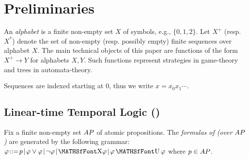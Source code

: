 
\section{Preliminaries} \label{sec:prelims}

An \emph{alphabet} is a finite non-empty set $X$ of symbols, e.g., $\{0,1,2\}$. Let $X^+$ (resp. $X^*$) denote the set of non-empty (resp. possibly empty) finite sequences over alphabet $X$. The main technical objects of this paper are functions of the form $X^+ \to Y$ for alphabets $X,Y$. Such functions represent strategies in game-theory and trees in automata-theory. 

Sequences are indexed starting at $0$, thus we write $x = x_0 x_1 \cdots$. 



\subsection{Linear-time Temporal Logic (\LTL)} \label{sec:prelims:LTL}

	Fix a finite non-empty set ${AP}$ of atomic propositions.
	The \emph{formulas of \LTL (over ${AP}$)} are generated by the following grammar:
	$\varphi \!::=\! p \!\mid\! \varphi \vee \varphi \!\mid\! \neg \varphi \!\mid\!  \nextX \! \varphi \!\mid \! \varphi \until \varphi$
	where $p \in {AP}$. 
	

